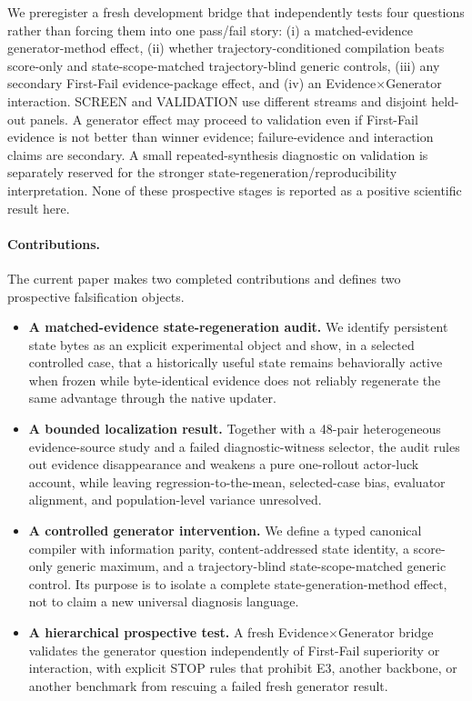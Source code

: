 We preregister a fresh development bridge that independently tests four questions rather than forcing them into one pass/fail story: (i) a matched-evidence generator-method effect, (ii) whether trajectory-conditioned compilation beats score-only and state-scope-matched trajectory-blind generic controls, (iii) any secondary First-Fail evidence-package effect, and (iv) an Evidence$\times$Generator interaction. SCREEN and VALIDATION use different streams and disjoint held-out panels. A generator effect may proceed to validation even if First-Fail evidence is not better than winner evidence; failure-evidence and interaction claims are secondary. A small repeated-synthesis diagnostic on validation is separately reserved for the stronger state-regeneration/reproducibility interpretation. None of these prospective stages is reported as a positive scientific result here.

\paragraph{Contributions.}
The current paper makes two completed contributions and defines two prospective falsification objects.
\begin{itemize}
    \item \textbf{A matched-evidence state-regeneration audit.} We identify persistent state bytes as an explicit experimental object and show, in a selected controlled case, that a historically useful state remains behaviorally active when frozen while byte-identical evidence does not reliably regenerate the same advantage through the native updater.
    \item \textbf{A bounded localization result.} Together with a 48-pair heterogeneous evidence-source study and a failed diagnostic-witness selector, the audit rules out evidence disappearance and weakens a pure one-rollout actor-luck account, while leaving regression-to-the-mean, selected-case bias, evaluator alignment, and population-level variance unresolved.
    \item \textbf{A controlled generator intervention.} We define a typed canonical compiler with information parity, content-addressed state identity, a score-only generic maximum, and a trajectory-blind state-scope-matched generic control. Its purpose is to isolate a complete state-generation-method effect, not to claim a new universal diagnosis language.
    \item \textbf{A hierarchical prospective test.} A fresh Evidence$\times$Generator bridge validates the generator question independently of First-Fail superiority or interaction, with explicit STOP rules that prohibit E3, another backbone, or another benchmark from rescuing a failed fresh generator result.
\end{itemize}
